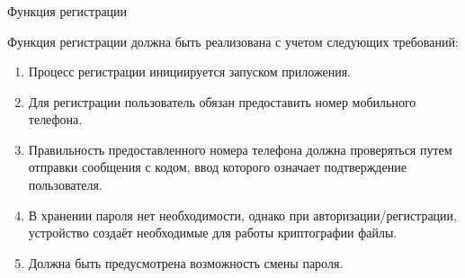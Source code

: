 \subsubsection{} Функция регистрации
\label{sec:analysis:research:funcreq:registration}

Функция регистрации должна быть реализована с учетом следующих требований:

\begin{enumerate}
	\item Процесс регистрации инициируется запуском приложения.
	\item Для регистрации пользователь обязан предоставить номер мобильного телефона.
	\item Правильность предоставленного номера телефона должна проверяться путем отправки сообщения с кодом, ввод которого означает подтверждение пользователя.
	\item В хранении пароля нет необходимости, однако при авторизации/регистрации, устройство создаёт необходимые для работы криптографии файлы.
	\item Должна быть предусмотрена возможность смены пароля.
\end{enumerate}